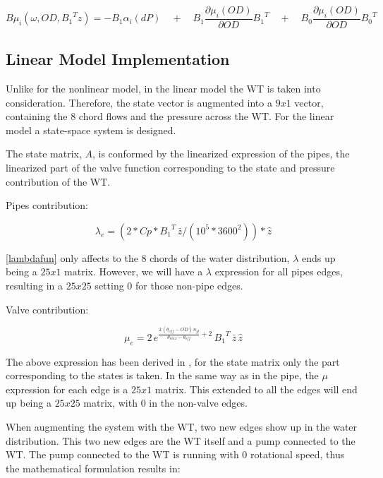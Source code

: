 \begin{equation}
  B \mu_{i}(\omega, OD, {B_1}^{T}z) = - B_1 \alpha_{i}(dP) \quad + \quad B_1 \frac{\partial{\mu_{i}(OD)}}{\partial{OD}} {B_1}^{T}
  \quad + \quad B_0 \frac{\partial{\mu_{i}(OD)}}{\partial{OD}} {B_0}^{T}
  \label{inputlinear}
\end{equation}



\subsection{Linear Model Implementation}
\label{MatlabScriptLinear}

Unlike for the nonlinear model, in the linear model the WT is taken into consideration. Therefore, the state vector is augmented into a $9x1$ vector, 
containing the 8 chord flows and the pressure across the WT. For the linear model a state-space system is designed.

The state matrix, $A$, is conformed by the linearized expression of the pipes, the linearized part of the valve function corresponding to the state and pressure contribution
of the WT.

Pipes contribution:

\begin{equation}
  {\lambda}_e = (2 * Cp * {B_1}^{T} \, \bar{z} /(10^5*3600^2))*\hat{z}
  \label{lambdafun}
\end{equation}

\eqref{lambdafun} only affects to the 8 chords of the water distribution, $\lambda$ ends up being a $25x1$ matrix. However, we will have a $\lambda$ expression for all pipes
edges, resulting in a $25x25$ setting $0$ for those non-pipe edges. 

Valve contribution:

\vspace{4mm}
\begin{equation}
  {\mu}_e =  2 \, e^{\frac{2 \, (\theta_{off} - \bar{OD}) \, n_{gl}}{\theta_{max}-\theta_{off}}+2} \, {B_1}^{T} \, \bar{z} \, \hat{z}
  \label{mufun}
\end{equation}

The above expression has been derived in , for the state matrix only the part corresponding to the states is taken. In the same way 
as in the pipe, the $\mu$ expression for each edge is a $25x1$ matrix. This extended to all the edges will end up being a $25x25$ matrix, with $0$ in the 
non-valve edges. 

When augmenting the system with the WT, two new edges show up in the water distribution. This two new edges are the WT itself and a pump connected to the WT.
The pump connected to the WT is running with $0$ rotational speed, thus the mathematical formulation results in:

